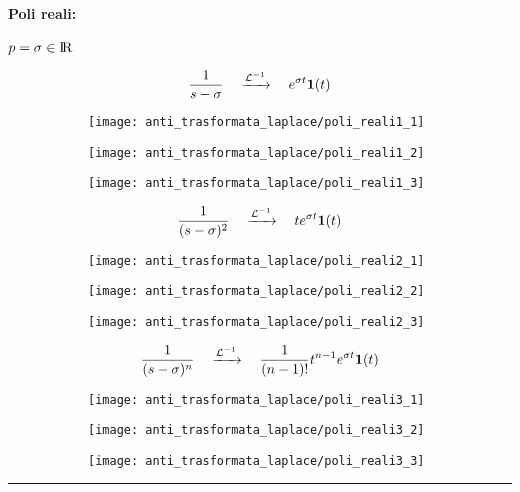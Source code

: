 \documentclass[../main.tex]{subfiles}
\begin{document}
		\paragraph{Poli reali:} $ p = \sigma \in \rm I\!R $
		\begin{figure}[H]
			\centering
			\[ 
				\frac{1}{s-\sigma} \quad \xrightarrow{\mathcal{L}^{-1}} \quad e^{\sigma t} \textbf{1}(t)
			\]
			\begin{subfigure}{0.3\textwidth}
				\texttt{[image: anti\_trasformata\_laplace/poli\_reali1\_1]}
			\end{subfigure}
			\begin{subfigure}{0.3\textwidth}
				\texttt{[image: anti\_trasformata\_laplace/poli\_reali1\_2]}
			\end{subfigure}
			\begin{subfigure}{0.3\textwidth}
				\texttt{[image: anti\_trasformata\_laplace/poli\_reali1\_3]}
			\end{subfigure}
		\end{figure}
		\begin{figure}[H]
			\[ 
				\frac{1}{(s-\sigma)^2} \quad \xrightarrow{\mathcal{L}^{-1}} \quad t e^{\sigma t} \textbf{1}(t) 
			\]
			\centering
			\begin{subfigure}{0.3\textwidth}
				\texttt{[image: anti\_trasformata\_laplace/poli\_reali2\_1]}
			\end{subfigure}
			\begin{subfigure}{0.3\textwidth}
				\texttt{[image: anti\_trasformata\_laplace/poli\_reali2\_2]}
			\end{subfigure}
			\begin{subfigure}{0.3\textwidth}
				\texttt{[image: anti\_trasformata\_laplace/poli\_reali2\_3]}
			\end{subfigure}
		\end{figure}
		\begin{figure}[H]
			\[
				\frac{1}{(s-\sigma)^n} \quad \xrightarrow{\mathcal{L}^{-1}} \quad \frac{1}{(n-1)!} t^{n-1} e^{\sigma t} \textbf{1}(t)
			\]
			\centering
			\begin{subfigure}{0.3\textwidth}
				\texttt{[image: anti\_trasformata\_laplace/poli\_reali3\_1]}
			\end{subfigure}
			\begin{subfigure}{0.3\textwidth}
				\texttt{[image: anti\_trasformata\_laplace/poli\_reali3\_2]}
			\end{subfigure}
			\begin{subfigure}{0.3\textwidth}
				\texttt{[image: anti\_trasformata\_laplace/poli\_reali3\_3]}
			\end{subfigure}
		\end{figure}
		\noindent\rule{\linewidth}{0.4pt}
\end{document}
